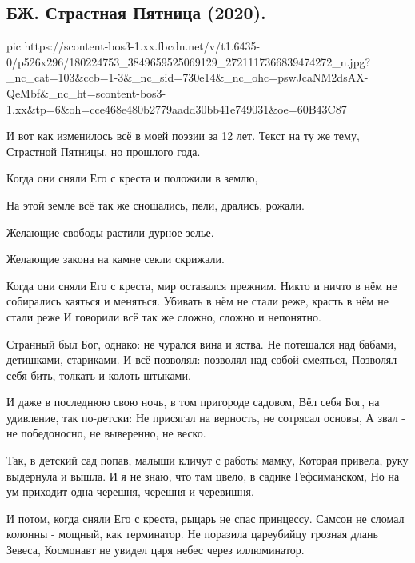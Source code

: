  
 
 
 
 
\subsection{БЖ. Страстная Пятница (2020).}
\label{sec:30_04_2021.fb.bilchenko_evgenia.2.krest_bog}


\ifcmt
  pic https://scontent-bos3-1.xx.fbcdn.net/v/t1.6435-0/p526x296/180224753_3849659525069129_2721117366839474272_n.jpg?_nc_cat=103&ccb=1-3&_nc_sid=730e14&_nc_ohc=pswJcaNM2dsAX-QeMbf&_nc_ht=scontent-bos3-1.xx&tp=6&oh=cce468e480b2779aadd30bb41e749031&oe=60B43C87
\fi


И вот как изменилось всё в моей поэзии за 12 лет. Текст на ту же тему, Страстной Пятницы, но прошлого года.

Когда они сняли Его с креста и положили в землю,

На этой земле всё так же сношались, пели, дрались, рожали.

Желающие свободы растили дурное зелье.

Желающие закона на камне секли скрижали.

Когда они сняли Его с креста, мир оставался прежним.
Никто и ничто в нём не собирались каяться и меняться.
Убивать в нём не стали реже, красть в нём не стали реже
И говорили всё так же сложно, сложно и непонятно.

Странный был Бог, однако: не чурался вина и яства.
Не потешался над бабами, детишками, стариками.
И всё позволял: позволял над собой смеяться,
Позволял себя бить, толкать и колоть штыками.

И даже в последнюю свою ночь, в том пригороде садовом,
Вёл себя Бог, на удивление, так по-детски:
Не присягал на верность, не сотрясал основы,
А звал - не победоносно, не выверенно, не веско.

Так, в детский сад попав, малыши кличут с работы мамку,
Которая привела, руку выдернула и вышла.
И я не знаю, что там цвело, в садике Гефсиманском,
Но на ум приходит одна черешня, черешня и черевишня.

И потом, когда сняли Его с креста, рыцарь не спас принцессу.
Самсон не сломал колонны - мощный, как терминатор.
Не поразила цареубийцу грозная длань Зевеса,
Космонавт не увидел царя небес через иллюминатор.

